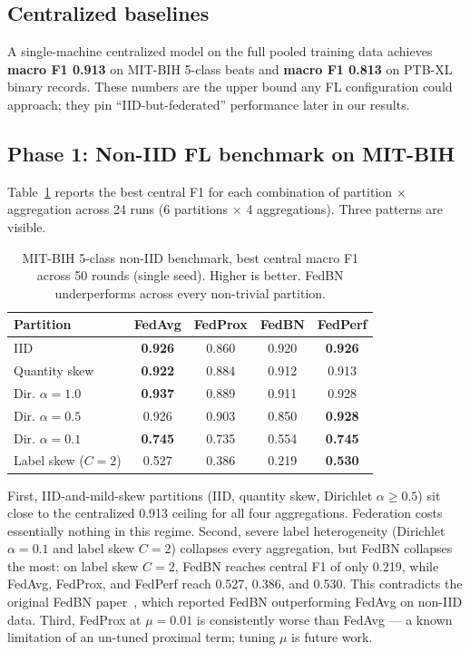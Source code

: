 \documentclass[conference]{IEEEtran}
\begin{document}
\subsection{Centralized baselines}
A single-machine centralized model on the full pooled training data achieves \textbf{macro F1 0.913} on MIT-BIH 5-class beats and \textbf{macro F1 0.813} on PTB-XL binary records. These numbers are the upper bound any FL configuration could approach; they pin ``IID-but-federated'' performance later in our results.

\subsection{Phase 1: Non-IID FL benchmark on MIT-BIH}
Table~\ref{tab:noniid} reports the best central F1 for each combination of partition $\times$ aggregation across 24 runs (6 partitions $\times$ 4 aggregations). Three patterns are visible.

\begin{table}[t]
\centering
\caption{MIT-BIH 5-class non-IID benchmark, best central macro F1 across 50 rounds (single seed). Higher is better. FedBN underperforms across every non-trivial partition.}
\label{tab:noniid}
\begin{tabular}{lcccc}
\toprule
Partition & FedAvg & FedProx & FedBN & FedPerf \\
\midrule
IID & \textbf{0.926} & 0.860 & 0.920 & \textbf{0.926} \\
Quantity skew & \textbf{0.922} & 0.884 & 0.912 & 0.913 \\
Dir. $\alpha{=}1.0$ & \textbf{0.937} & 0.889 & 0.911 & 0.928 \\
Dir. $\alpha{=}0.5$ & 0.926 & 0.903 & 0.850 & \textbf{0.928} \\
Dir. $\alpha{=}0.1$ & \textbf{0.745} & 0.735 & 0.554 & \textbf{0.745} \\
Label skew ($C{=}2$) & 0.527 & 0.386 & 0.219 & \textbf{0.530} \\
\bottomrule
\end{tabular}
\end{table}

First, IID-and-mild-skew partitions (IID, quantity skew, Dirichlet $\alpha \geq 0.5$) sit close to the centralized 0.913 ceiling for all four aggregations. Federation costs essentially nothing in this regime. Second, severe label heterogeneity (Dirichlet $\alpha{=}0.1$ and label skew $C{=}2$) collapses every aggregation, but FedBN collapses the most: on label skew $C{=}2$, FedBN reaches central F1 of only 0.219, while FedAvg, FedProx, and FedPerf reach 0.527, 0.386, and 0.530. This contradicts the original FedBN paper~\cite{fedbn}, which reported FedBN outperforming FedAvg on non-IID data. Third, FedProx at $\mu{=}0.01$ is consistently worse than FedAvg --- a known limitation of an un-tuned proximal term; tuning $\mu$ is future work.
\end{document}
